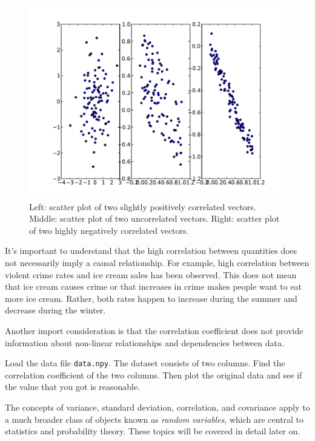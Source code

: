 \begin{figure}[h]
\includegraphics[width=\textwidth]{correlation}
\caption{Left: scatter plot of two slightly positively correlated vectors.
         Middle: scatter plot of two uncorrelated vectors.
         Right: scatter plot of two highly negatively correlated vectors.}
\label{fig:correlation}
\end{figure}
  
It's important to understand that the high correlation between quantities does not necessarily imply 
a causal relationship. For example, high correlation between violent crime rates and ice cream sales has 
been observed. This does not mean that ice cream causes crime or that increases in crime makes people want 
to eat more ice cream. Rather, both rates happen to increase during the summer and decrease during the winter.

Another import consideration is that the correlation coefficient does not provide information about 
non-linear relationships and dependencies between data. 

\begin{problem}
Load the data file \texttt{data.npy}.
The dataset consists of two columns.  Find the correlation coefficient of the two columns.  Then plot the original data and see if the value that you got is reasonable.
\end{problem}

The concepts of variance, standard deviation, correlation, and covariance apply to a much broader class of objects
known as \emph{random variables}, which are central to statistics and probability theory. These topics will be 
covered in detail later on. 
